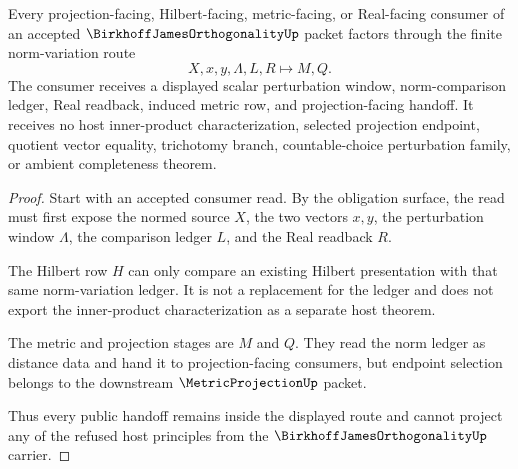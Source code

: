 \begin{theorem}
\label{thm:birkhoff-james-orthogonality-norm-variation-handoff}
Every projection-facing, Hilbert-facing, metric-facing, or Real-facing consumer of an accepted $\BirkhoffJamesOrthogonalityUp$ packet factors through the finite norm-variation route
$$
X,x,y,\Lambda,L,R
\longmapsto
M,Q .
$$
The consumer receives a displayed scalar perturbation window, norm-comparison ledger, Real readback, induced metric row, and projection-facing handoff. It receives no host inner-product characterization, selected projection endpoint, quotient vector equality, trichotomy branch, countable-choice perturbation family, or ambient completeness theorem.
\end{theorem}
\begin{proof}
Start with an accepted consumer read. By the obligation surface, the read must first expose the normed source $X$, the two vectors $x,y$, the perturbation window $\Lambda$, the comparison ledger $L$, and the Real readback $R$.

The Hilbert row $H$ can only compare an existing Hilbert presentation with that same norm-variation ledger. It is not a replacement for the ledger and does not export the inner-product characterization as a separate host theorem.

The metric and projection stages are $M$ and $Q$. They read the norm ledger as distance data and hand it to projection-facing consumers, but endpoint selection belongs to the downstream $\MetricProjectionUp$ packet.

Thus every public handoff remains inside the displayed route and cannot project any of the refused host principles from the $\BirkhoffJamesOrthogonalityUp$ carrier.
\end{proof}



